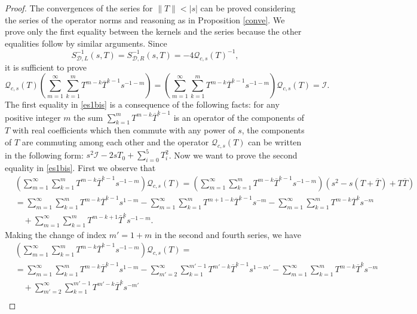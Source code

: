 \documentclass[reqno,11pt]{amsart}
\numberwithin{equation}{section}
\theoremstyle{definition}
\begin{document}
\begin{proof}
	The convergences of the series for $\|T\|<|s|$ can be proved considering the series of the operator norms and reasoning as in Proposition \ref{conve}. We prove only the first equality between the kernels and the series because the other equalities follow by similar arguments. Since $$S^{-1}_{\mathcal D,L}(s,T)=S^{-1}_{\mathcal D,R}(s,T)=-4\mathcal Q_{c,s}(T)^{-1},$$ it is sufficient to prove
	\begin{equation}\label{es1bis}
		\mathcal Q_{c,s}(T)\left(\sum_{m=1}^\infty  \sum_{k=1}^m T^{m-k} \overline T^{k-1} s^{-1-m}\right)=\left(\sum_{m=1}^\infty  \sum_{k=1}^m T^{m-k} \overline T^{k-1} s^{-1-m}\right)\mathcal Q_{c,s}(T)=\mathcal I .
	\end{equation}
	The first equality in \eqref{es1bis} is a consequence of the following facts: for any positive integer $m$ the sum $\sum_{k=1}^m T^{m-k}\overline T^{k-1}$ is an operator of the components of $T$ with real coefficients which then commute with any power of $s$, the components of $T$ are commuting among each other and the operator $\mathcal Q_{c,s}(T)$ can be written in the following form: $s^2\mathcal I-2s T_0+\sum_{i=0}^5 T_i^2$. Now we want to prove the second equality in \eqref{es1bis}. First we observe that
	\[
	\begin{split}
		&\left(\sum_{m=1}^\infty  \sum_{k=1}^m T^{m-k} \overline T^{k-1} s^{-1-m}\right)\mathcal Q_{c,s}(T)=\left(\sum_{m=1}^\infty  \sum_{k=1}^m T^{m-k} \overline T^{k-1} s^{-1-m}\right)(s^2-s(T+\overline T)+T\overline T)\\
		&= \sum_{m=1}^\infty  \sum_{k=1}^m T^{m-k}\overline{T}^{k-1}s^{1-m}- \sum_{m=1}^\infty  \sum_{k=1}^m T^{m+1-k}\overline T^{k-1}s^{-m} - \sum_{m=1}^\infty \sum_{k=1}^m T^{m-k}\overline T^k s^{-m}\\
		&\, \, \, \, \, \,+ \sum_{m=1}^{\infty} \sum_{k=1}^m T^{m-k+1} \bar{T}^{k}s^{-1-m}.
	\end{split}
	\]
	Making the change of index $m'=1+m$ in the second and fourth series, we have
	\[
	\begin{split}
		&\left(\sum_{m=1}^\infty  \sum_{k=1}^m T^{m-k} \overline T^{k-1} s^{-1-m}\right)\mathcal Q_{c,s}(T)=\\
		&= \sum_{m=1}^\infty  \sum_{k=1}^m T^{m-k}\overline{T}^{k-1}s^{1-m}- \sum_{m'=2}^\infty  \sum_{k=1}^{m'-1} T^{m'-k}\overline T^{k-1}s^{1-m'} - \sum_{m=1}^\infty \sum_{k=1}^m T^{m-k}\overline T^k s^{-m}\\
		&\, \, \, \, \, \,+\sum_{m'=2}^\infty  \sum_{k=1}^{m'-1} T^{m'-k} \overline T^k s^{-m'}\\

\end{split}\]
\end{proof}
\end{document}
